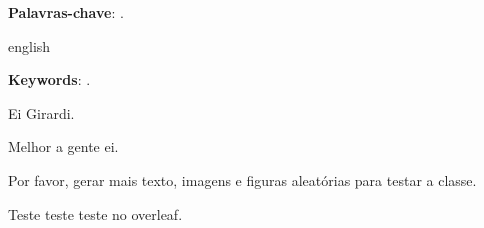 \documentclass[12pt,openright,oneside,a4paper,english,brazil]{iaeMM}
\begin{document}
\setlength{\absparsep}{18pt} %
\begin{resumo}[Resumo]
 \Resumo

 \textbf{Palavras-chave}: \PalavrasChave.
\end{resumo}%
\begin{resumo}[Abstract]
 \begin{otherlanguage*}{english}
   \Abstract
 
   \noindent 
   \textbf{Keywords}: \Keywords.
 \end{otherlanguage*}
\end{resumo}\newpage
\listoffigures*
\cleardoublepage

\listoftables*
\cleardoublepage
\tableofcontents*
\cleardoublepage


\textual


Ei Girardi.

Melhor a gente ei.

Por favor, gerar mais texto, imagens e figuras aleatórias para testar a classe.

Teste teste teste no overleaf.
%

\postextual

\begin{apendicesenv}

%

%

%

%

%

%

\end{apendicesenv}


\end{document}
